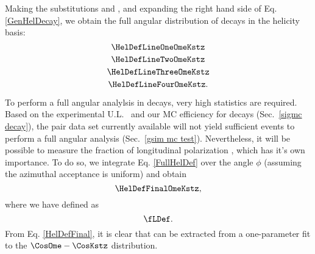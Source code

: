 Making the substitutions \ThOneToThOme and \ThTwoToThKstz, and expanding the right hand side of Eq. \ref{GenHelDecay}, we obtain the full angular distribution of \BzToOmeKstz decays in the helicity basis: 
\begin{equation}   \label{FullHelDef}
\HelDefLineOneOmeKstz   %
\end{equation}
\begin{equation} 
\HelDefLineTwoOmeKstz  \nonumber \\
\end{equation}
\begin{equation} 
\HelDefLineThreeOmeKstz  \nonumber  \\
\end{equation}
\begin{equation} 
\HelDefLineFourOmeKstz.  \nonumber
\end{equation}
\begin{comment}
\begin{eqnarray}\label{FullHelDef}
\lefteqn{\HelDefLineOneOmeKstz}   \\
& \HelDefLineTwoOmeKstz  \nonumber \\
& \HelDefLineThreeOmeKstz  \nonumber  \\
& \HelDefLineFourOmeKstz  \nonumber
\end{eqnarray}
\end{comment}
To perform a full angular analylsis in \Bvv decays, very high statistics are required. Based on the experimental U.L.~\cite{babar_wKstz_2} and our MC efficiency for \BzToOmeKstz decays (Sec.~\ref{sigmc decay}), the \NBBbarVal \BBbar pair data set currently available will not yield sufficient events to perform a full angular analysis (Sec.~\ref{gsim mc test}). Nevertheless, it will be possible to measure the fraction of longitudinal polarization \fL, which has it's own importance. To do so, we integrate Eq. \ref{FullHelDef} over the angle $\phi$ (assuming the azimuthal acceptance is uniform) and obtain 
\begin{equation}\label{HelDefFinal}
\HelDefFinalOmeKstz,
\end{equation}
where we have defined \fL as%
\begin{equation}
\fLDef.
\end{equation}
From Eq. \ref{HelDefFinal}, it is clear that \fL can be extracted from a one-parameter fit to the $\CosOme - \CosKstz$ distribution. 

